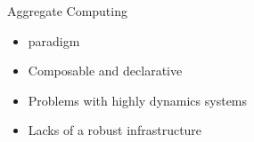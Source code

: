 \begin{frame}{Aggregate Computing}
  \begin{card}
    \begin{itemize}
      \item[\faThumbsUp]  paradigm
      \item[\faThumbsUp] Composable and declarative 
      \item[{\color{materialRed} \faThumbsDown}] Problems with highly dynamics systems
      \item[{\color{materialRed} \faThumbsDown}] Lacks of a robust infrastructure
    \end{itemize}
  \end{card}

  \begin{columns}
    \begin{column}{0.25\textwidth}
    \end{column}
    \begin{column}{0.25\textwidth}
    \end{column}
  \end{columns}
\end{frame}